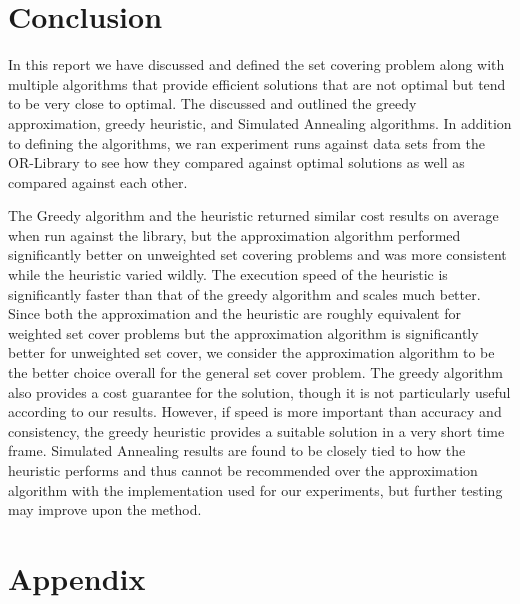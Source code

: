 \documentclass{report}
\begin{document}
\section{Conclusion}
In this report we have discussed and defined the set covering problem along with multiple algorithms that provide efficient solutions that are not optimal but tend to be very close to optimal. The discussed and outlined the greedy approximation, greedy heuristic, and Simulated Annealing algorithms. In addition to defining the algorithms, we ran experiment runs against data sets from the OR-Library to see how they compared against optimal solutions as well as compared against each other.

The Greedy algorithm and the heuristic returned similar cost results on average when run against the library, but the approximation algorithm performed significantly better on unweighted set covering problems and was more consistent while the heuristic varied wildly. The execution speed of the heuristic is significantly faster than that of the greedy algorithm and scales much better. Since both the approximation and the heuristic are roughly equivalent for weighted set cover problems but the approximation algorithm is significantly better for unweighted set cover, we consider the approximation algorithm to be the better choice overall for the general set cover problem. The greedy algorithm also provides a cost guarantee for the solution, though it is not particularly useful according to our results. However, if speed is more important than accuracy and consistency, the greedy heuristic provides a suitable solution in a very short time frame. Simulated Annealing results are found to be closely tied to how the heuristic performs and thus cannot be recommended over the approximation algorithm with the implementation used for our experiments, but further testing may improve upon the method. 

\section{Appendix}
\end{document}
